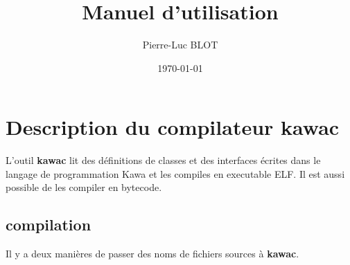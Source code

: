 \documentclass{../res/univ-projet}
\title{Manuel d'utilisation}
\author{Pierre-Luc BLOT}
\date{\today}
\begin{document}
\maketitle
\newpage
\tableofcontents
\newpage

\section{Description du compilateur kawac} 
L'outil \textbf{kawac} lit des définitions de classes et des interfaces écrites dans le
langage de programmation Kawa et les compiles en executable ELF. Il est aussi
possible de les compiler en bytecode.

  \subsection{compilation}
    Il y a deux manières de passer des noms de fichiers sources à \textbf{kawac}.
\end{document}
